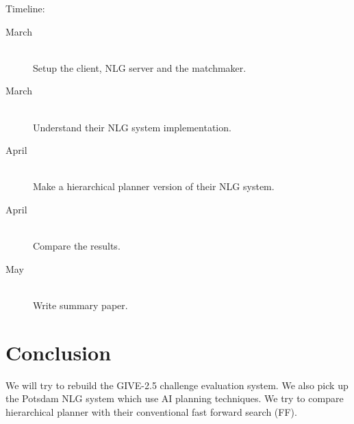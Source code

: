 \documentclass[11pt]{article} %
\begin{document}
\noindent
Timeline:

\begin{description}
  \item[March] \hfill \\
   Setup the client, NLG server and the matchmaker.
  \item[March] \hfill \\
  Understand their NLG system implementation.
  \item[April] \hfill \\
  Make a hierarchical planner version of their NLG system.
  \item[April] \hfill \\
  Compare the results.
  \item[May] \hfill \\
  Write summary paper.
\end{description}

\section{Conclusion}
We will try to rebuild the GIVE-2.5 challenge evaluation system.
We also pick up the Potsdam NLG system which use AI planning techniques.
We try to compare hierarchical planner with their conventional fast forward search (FF). 




\end{document}
